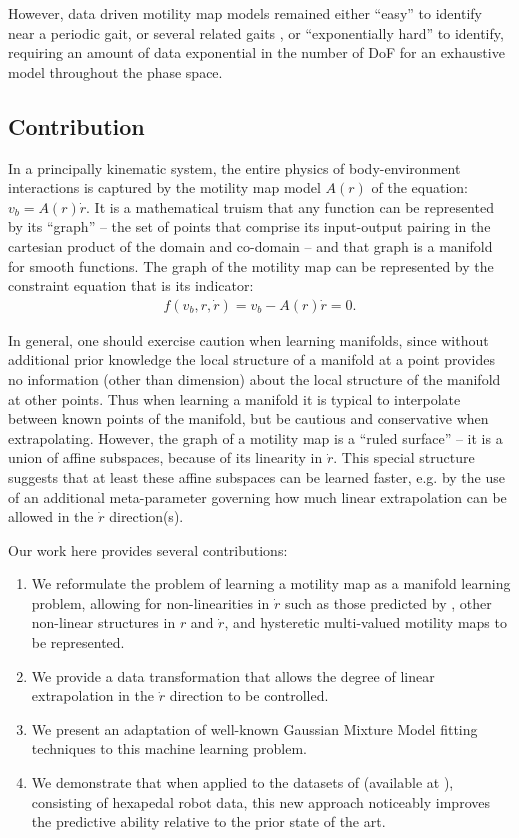 \documentclass[conference]{IEEEtran}
\begin{document}
However, data driven motility map models remained either ``easy'' to identify near a periodic gait, or several related gaits , or ``exponentially hard'' to identify, requiring an amount of data exponential in the number of DoF for an exhaustive model  throughout the phase space.

\subsection{Contribution}

In a principally kinematic system, the entire physics of body-environment interactions is captured by the motility map model $A(r)$ of the equation: $v_b = A(r) \dot{r}$.
It is a mathematical truism that any function can be represented by its ``graph'' -- the set of points that comprise its input-output pairing in the cartesian product of the domain and co-domain -- and that graph is a manifold for smooth functions.
The graph of the motility map can be represented by the constraint equation that is its indicator:
\begin{align}
  f(v_b, r, \dot{r}) = v_b - A(r) \dot{r} = 0. \label{eqn:graph}
\end{align}

In general, one should exercise caution when learning manifolds, since without additional prior knowledge the local structure of a manifold at a point provides no information (other than dimension) about the local structure of the manifold at other points.
Thus when learning a manifold it is typical to interpolate between known points of the manifold, but be cautious and conservative when extrapolating.
However, the graph of a motility map is a ``ruled surface'' -- it is a union of affine subspaces, because of its linearity in $\dot r$.
This special structure suggests that at least these affine subspaces can be learned faster, e.g. by the use of an additional meta-parameter governing how much linear extrapolation can be allowed in the $\dot r$ direction(s).

Our work here provides several contributions:
\begin{enumerate}
  \item We reformulate the problem of learning a motility map as a manifold learning problem, allowing for non-linearities in $\dot r$ such as those predicted by , other non-linear structures in $r$ and $\dot r$, and hysteretic multi-valued motility maps to be represented.
  \item We provide a data transformation that allows the degree of linear extrapolation in the $\dot r$ direction to be controlled.
  \item We present an adaptation of well-known Gaussian Mixture Model fitting techniques to this machine learning problem.
  \item We demonstrate that when applied to the datasets of  (available at ), consisting of hexapedal robot data, this new approach noticeably improves the predictive ability relative to the prior state of the art. %
\end{enumerate}
\end{document}
